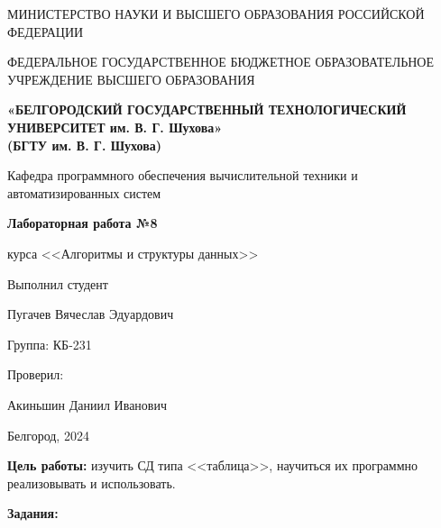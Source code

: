 \documentclass[12pt]{article}
\begin{document}
	\begin{center}
		{\parskip=1cm
			МИНИСТЕРСТВО НАУКИ И ВЫСШЕГО ОБРАЗОВАНИЯ РОССИЙСКОЙ ФЕДЕРАЦИИ
			
			ФЕДЕРАЛЬНОЕ ГОСУДАРСТВЕННОЕ БЮДЖЕТНОЕ ОБРАЗОВАТЕЛЬНОЕ УЧРЕЖДЕНИЕ ВЫСШЕГО ОБРАЗОВАНИЯ
			
			{\bf«БЕЛГОРОДСКИЙ ГОСУДАРСТВЕННЫЙ ТЕХНОЛОГИЧЕСКИЙ УНИВЕРСИТЕТ им. В. Г. Шухова»\\(БГТУ им. В. Г. Шухова)}
			
		
			Кафедра программного обеспечения вычислительной техники и автоматизированных систем
		}
		
		\vspace{5cm}
		
		{\Large 
			{\bf
				 Лабораторная работа №8
				
				курса <<Алгоритмы и структуры данных>>
				
			}
			
		}
	\end{center}
	\begin{flushright}
		{\parskip=3cm Выполнил студент}
		
		Пугачев Вячеслав Эдуардович
		
		Группа: КБ-231
		
		Проверил:
		
		Акиньшин Даниил Иванович
	\end{flushright}
	\begin{center}
		{\parskip=3cm Белгород, 2024}
	\end{center}
	\newpage
	
	{\bf Цель работы:} изучить СД типа <<таблица>>, научиться их программно реализовывать и использовать.
	
	{\bf Задания:}
	
	
\end{document}
